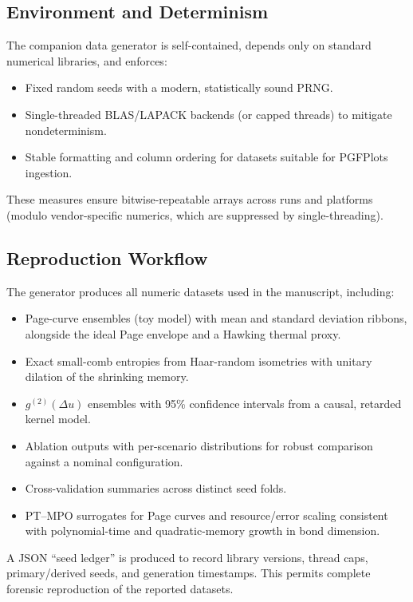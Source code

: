 \documentclass[11pt,a4paper]{article}
\theoremstyle{plain}
\theoremstyle{definition}
\theoremstyle{remark}
\begin{document}
\subsection{Environment and Determinism}
The companion data generator is self-contained, depends only on standard numerical libraries, and enforces:
\begin{itemize}
  \item Fixed random seeds with a modern, statistically sound PRNG.
  \item Single-threaded BLAS/LAPACK backends (or capped threads) to mitigate nondeterminism.
  \item Stable formatting and column ordering for datasets suitable for PGFPlots ingestion.
\end{itemize}
These measures ensure bitwise-repeatable arrays across runs and platforms (modulo vendor-specific numerics, which are suppressed by single-threading).

\subsection{Reproduction Workflow}
The generator produces all numeric datasets used in the manuscript, including:
\begin{itemize}
  \item Page-curve ensembles (toy model) with mean and standard deviation ribbons, alongside the ideal Page envelope and a Hawking thermal proxy.
  \item Exact small-comb entropies from Haar-random isometries with unitary dilation of the shrinking memory.
  \item $g^{(2)}(\Delta u)$ ensembles with 95\% confidence intervals from a causal, retarded kernel model.
  \item Ablation outputs with per-scenario distributions for robust comparison against a nominal configuration.
  \item Cross-validation summaries across distinct seed folds.
  \item PT--MPO surrogates for Page curves and resource/error scaling consistent with polynomial-time and quadratic-memory growth in bond dimension.
\end{itemize}
A JSON ``seed ledger'' is produced to record library versions, thread caps, primary/derived seeds, and generation timestamps. This permits complete forensic reproduction of the reported datasets.
\end{document}
